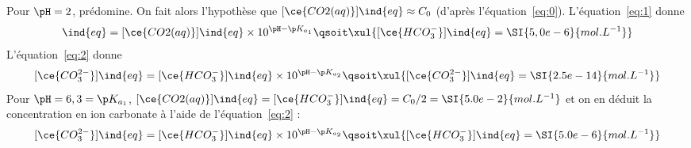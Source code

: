 \documentclass[../DS08.tex]{subfiles}%
\begin{document}
{\begin{itemize}%
	Pour $\pH=2$,  prédomine. On fait alors
	l'hypothèse que $[\ce{CO2(aq)}]\ind{eq}\approx C_0$ (d'après
	l'équation~\eqref{eq:0}). L'équation~\eqref{eq:1} donne
	\begin{gather*}
		[\ce{HCO^-_3}]\ind{eq} =
		[\ce{CO2(aq)}]\ind{eq}\times 10^{\pH-\p K_{a_1}}
		\qsoit
		\xul{[\ce{HCO^-_3}]\ind{eq}=\SI{5,0e-6}{mol.L^{-1}}}%
	\end{gather*}
	L'équation~\eqref{eq:2} donne
	\[
		[\ce{CO^{2-}_3}]\ind{eq} =
		[\ce{HCO^-_3}]\ind{eq}\times 10^{\pH-\p K_{a_2}}
		\qsoit
		\xul{[\ce{CO^{2-}_3}]\ind{eq}=\SI{2.5e-14}{mol.L^{-1}}}
	\]
	Pour $\pH=6,3=\p K_{a_1} $, $[\ce{CO2(aq)}]\ind{eq}=[\ce{HCO^-_3}]\ind{eq} =
		C_0/2 = \SI{5.0e-2}{mol.L^{-1}}$ et on en déduit la concentration en ion
	carbonate à l'aide de l'équation~\eqref{eq:2} :
	\[
		[\ce{CO^{2-}_3}]\ind{eq}=
		[\ce{HCO^-_3}]\ind{eq}\times 10^{\pH-\p K_{a_2}}
		\qsoit
		\xul{[\ce{HCO^-_3}]\ind{eq}=\SI{5.0e-6}{mol.L^{-1}}}
	\]


\end{itemize}}
\end{document}
